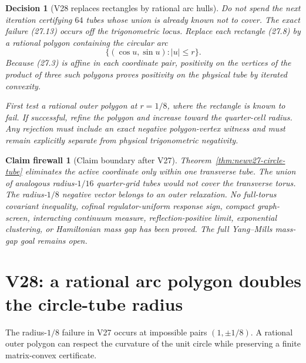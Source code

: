 \documentclass[11pt,oneside]{article}
\newtheorem{firewall}[theorem]{Claim firewall}
\newtheorem{decision}[theorem]{Decision}
\theoremstyle{definition}
\theoremstyle{remark}
\begin{document}
\begin{decision}[V28 replaces rectangles by rational arc hulls]
\label{dec:newv27-next}
Do not spend the next iteration certifying \(64\) tubes whose union
is already known not to cover.  The exact failure (27.13) occurs
off the trigonometric locus.  Replace each rectangle (27.8) by a
rational polygon containing the circular arc
\[
 \{(\cos u,\sin u):|u|\le r\}.
\]
Because (27.3) is affine in each coordinate pair, positivity on the
vertices of the product of three such polygons proves positivity on
the physical tube by iterated convexity.

First test a rational outer polygon at \(r=1/8\), where the
rectangle is known to fail.  If successful, refine the polygon and
increase toward the quarter-cell radius.  Any rejection must include
an exact negative polygon-vertex witness and must remain explicitly
separate from physical trigonometric negativity.
\end{decision}

\begin{firewall}[Claim boundary after V27]
\label{fire:newv27-final}
Theorem~\ref{thm:newv27-circle-tube} eliminates the active coordinate
only within one transverse tube.  The union of analogous
radius-\(1/16\) quarter-grid tubes would not cover the transverse
torus.  The radius-\(1/8\) negative vector belongs to an outer
relaxation.  No full-torus covariant inequality, cofinal
regulator-uniform response sign, compact graph-screen, interacting
continuum measure, reflection-positive limit, exponential
clustering, or Hamiltonian mass gap has been proved.  The full
Yang--Mills mass-gap goal remains open.
\end{firewall}

\section{V28: a rational arc polygon doubles the circle-tube radius}
\label{sec:newv28-arc-polygon}

The radius-\(1/8\) failure in V27 occurs at impossible pairs
\((1,\pm1/8)\).  A rational outer polygon can respect the curvature
of the unit circle while preserving a finite matrix-convex
certificate.
\end{document}
